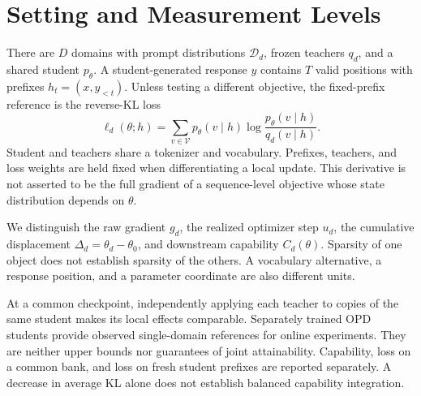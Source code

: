 \section{Setting and Measurement Levels}
\label{sec:setting}

There are $D$ domains with prompt distributions $\mathcal D_d$, frozen
teachers $q_d$, and a shared student $p_\theta$. A student-generated
response $y$ contains $T$ valid positions with prefixes
$h_t=(x,y_{<t})$. Unless testing a different objective, the fixed-prefix
reference is the reverse-KL loss
\begin{equation}
\ell_d(\theta;h)=\sum_{v\in\mathcal V}
p_\theta(v\mid h)\log\frac{p_\theta(v\mid h)}{q_d(v\mid h)}.
\label{eq:reference_reverse_kl}
\end{equation}
Student and teachers share a tokenizer and vocabulary. Prefixes,
teachers, and loss weights are held fixed when differentiating a local
update. This derivative is not asserted to be the full gradient of a
sequence-level objective whose state distribution depends on $\theta$.

We distinguish the raw gradient $g_d$, the realized optimizer step
$u_d$, the cumulative displacement $\Delta_d=\theta_d-\theta_0$, and
downstream capability $C_d(\theta)$. Sparsity of one object does not
establish sparsity of the others. A vocabulary alternative, a response
position, and a parameter coordinate are also different units.

At a common checkpoint, independently applying each teacher to copies
of the same student makes its local effects comparable. Separately
trained OPD students provide observed single-domain references for
online experiments. They are neither upper bounds nor guarantees of
joint attainability. Capability, loss on a common bank, and loss on
fresh student prefixes are reported separately. A decrease in average
KL alone does not establish balanced capability integration.
